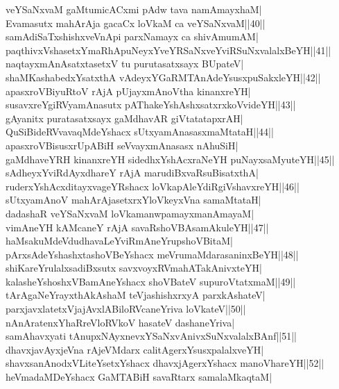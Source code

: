 \documentclass{article}
\begin{document}
veYSaNxvaM gaMtumicACxmi pAdw tava namAmayxhaM|\\
Evamasutx mahArAja gacaCx loVkaM ca veYSaNxvaM||40||\\
samAdiSaTxshishxveVnApi parxNamayx ca shivAmumAM|\\
paqthivxVshasetxYmaRhApuNeyxYveYRSaNxveYviRSuNxvalalxBeYH||41||\\
naqtayxmAnAsatxtasetxV tu purutasatxsayx BUpateV|\\
shaMKashabedxYsatxthA vAdeyxYGaRMTAnAdeYsusxpuSakxleYH||42||\\
apasxroVBiyuRtoV rAjA pUjayxmAnoVtha kinanxreYH|\\
susavxreYgiRVyamAnasutx pAThakeYshAshxsatxrxkoVvideYH||43||\\
gAyanitx puratasatxsayx gaMdhavAR giVtatatapxrAH|\\
QuSiBideRVvavaqMdeYshacx sUtxyamAnasasxmaMtataH||44||\\
apasxroVBisusxrUpABiH seVvayxmAnasasx nAhuSiH|\\
gaMdhaveYRH kinanxreYH sidedhxYshAcxraNeYH puNayxsaMyuteYH||45||\\
sAdheyxYviRdAyxdhareY rAjA marudiBxvaRsuBisatxthA|\\
ruderxYshAcxditayxvageYRshacx loVkapAleYdiRgiVshavxreYH||46||\\
sUtxyamAnoV mahArAjasetxrxYloVkeyxVna samaMtataH|\\
dadashaR veYSaNxvaM loVkamanwpamayxmanAmayaM|\\
vimAneYH kAMcaneY rAjA savaRshoVBAsamAkuleYH||47||\\
haMsakuMdeVdudhavaLeYviRmAneYrupshoVBitaM|\\
pArxsAdeYshashxtashoVBeYshacx meVrumaMdarasaninxBeYH||48||\\
shiKareYrulalxsadiBxsutx savxvoyxRVmahATakAnivxteYH|\\
kalasheYshoshxVBamAneYshacx shoVBateV supuroVtatxmaM||49||\\
tArAgaNeYrayxthAkAshaM teVjashishxrxyA parxkAshateV|\\
parxjavxlatetxVjajAvxlABiloRVcaneYriva loVkateV||50||\\
nAnAratenxYhaRreVloRVkoV hasateV dashaneYriva|\\
samAhavxyati tAnupxNAyxnevxYSaNxvAnivxSuNxvalalxBAnf||51||\\
dhavxjavAyxjeVna rAjeVMdarx calitAgerxYsusxpalalxveYH|\\
shavxsanAnodxVLiteYsetxYshacx dhavxjAgerxYshacx manoVhareYH||52||\\
heVmadaMDeYshacx GaMTABiH savaRtarx samalaMkaqtaM|\\
\end{document}

